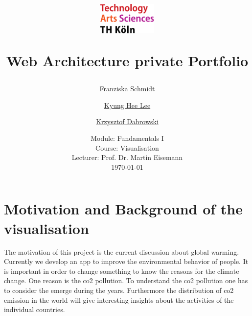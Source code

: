 \documentclass[a4paper]{article}
\begin{document}
	\title{
	\begin{figure}[!ht]
			\includegraphics[width=0.26\textwidth]{THlogoheader.pdf}
	\end{figure}
	\vspace{1cm}
	\Huge Web Architecture private Portfolio
	}
	
	\vspace{1cm}
	
	\author{\Large \href{}{Franziska Schmidt} \and \Large  \href{}{Kyung Hee Lee} \and \Large  \href{mailto:krzysztof_jedrzej.dabrowski@smail.th-koeln.de}{Krzysztof Dabrowski} \and \Large  
	\vspace{1cm}}
	
	\date{
	\large Module: Fundamentals I \\ Course: Visualisation \\ 
	\vspace{0.8cm}
	\large Lecturer: Prof. Dr. Martin Eisemann \\
	\vspace{1cm}
	\today
	}

	\maketitle
	\setlength{\parindent}{0pt}

\vspace{2cm} 
	\newpage
	
\section{Motivation and Background of the visualisation} %
The motivation of this project is the current discussion about global warming. Currently we develop an app to improve the environmental behavior of people. It is important in order to change something to know the reasons for the climate change. One reason is the co2 pollution. To understand the co2 pollution one has to consider the emerge during the years. Furthermore the distribution of co2 emission in the world will give interesting insights about the activities of the individual countries.
\end{document}
